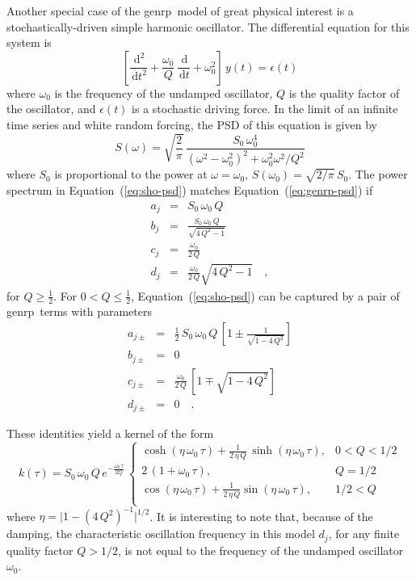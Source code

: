 \documentclass[manuscript, letterpaper]{aastex6}
\newcommand{\project}[1]{\textsf{#1}}
\newcommand{\genrp}{\project{genrp}}
\renewcommand{\eqref}[1]{\ref{eq:#1}}
\newcommand{\Eq}[1]{Equation~(\eqref{#1})}
\newcommand{\eq}[1]{\Eq{#1}}
\newcommand{\eqlabel}[1]{\label{eq:#1}}
\newcommand{\dd}{\ensuremath{\,\mathrm{d}}}
\begin{document}
Another special case of the \genrp\ model of great physical interest is a
stochastically-driven simple harmonic oscillator.
The differential equation for this system is
\begin{equation}
    \left[\frac{\dd^2}{\dd t^2} + \frac{\omega_0}{Q}\,\frac{\dd}{\dd t}
    + \omega_0^2\right]\, y(t) = \epsilon(t)
\end{equation}
where $\omega_0$ is the frequency of the undamped oscillator, $Q$ is the
quality factor of the oscillator, and $\epsilon(t)$ is a stochastic driving
force.
In the limit of an infinite time series and white random forcing, the PSD of
this equation is given by \citep{Anderson:1990}
\begin{equation}\eqlabel{sho-psd}
S(\omega) = \sqrt{\frac{2}{\pi}}\,\frac{S_0\,\omega_0^4}
    {(\omega^2-\omega_0^2)^2 + \omega_0^2\omega^2/Q^2}
\end{equation}
where $S_0$ is proportional to the power at $\omega = \omega_0$, $S(\omega_0)
= \sqrt{2/\pi}\,S_0$.
The power spectrum in \eq{sho-psd} matches \eq{genrp-psd} if
\begin{eqnarray}
a_j &=& S_0\,\omega_0\,Q \\
    b_j &=& \frac{S_0\,\omega_0\,Q}{\sqrt{4\,Q^2-1}} \\
c_j &=& \frac{\omega_0}{2\,Q}\\
d_j &=& \frac{\omega_0}{2\,Q} \sqrt{4\,Q^2-1} \quad,
\end{eqnarray}
for $Q \ge \frac{1}{2}$.
For $0 < Q \le \frac{1}{2}$, \eq{sho-psd} can be captured by a pair of \genrp\
terms with parameters
\begin{eqnarray}
a_{j\pm} &=& \frac{1}{2}\,S_0\,\omega_0\,Q\,\left[ 1 \pm
        \frac{1}{\sqrt{1-4\,Q^2}}\right] \\
b_{j\pm} &=& 0 \\
    c_{j\pm} &=& \frac{\omega_0}{2\,Q}\,\left[1 \mp \sqrt{1-4\,Q^2}\right] \\
d_{j\pm} &=& 0 \quad.
\end{eqnarray}

These identities yield a kernel of the form
\begin{equation}
k(\tau) = S_0\,\omega_0\,Q\,e^{-\frac{\omega_0\,\tau}{2Q}}\,
\begin{cases}
    \cosh{(\eta\,\omega_0\,\tau)} +
        \frac{1}{2\,\eta\,Q}\,\sinh{(\eta\,\omega_0\,\tau)}, & 0 < Q < 1/2\\
    2\,(1+\omega_0\,\tau), & Q = 1/2\\
    \cos{(\eta\,\omega_0\,\tau)} +
        \frac{1}{2\,\eta\,Q} \sin{(\eta\,\omega_0\,\tau)},& 1/2 < Q\\
\end{cases}
\end{equation}
where $\eta = \vert 1-(4\,Q^2)^{-1}\vert^{1/2}$.
It is interesting to note that, because of the damping, the characteristic
oscillation frequency in this model $d_j$, for any finite quality factor $Q > 1/2$,
is not equal to the frequency of the undamped oscillator $\omega_0$.
\end{document}
